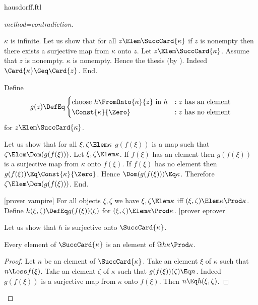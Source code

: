 \documentclass{stex}
\begin{document}
\begin{smodule}{hausdorff.ftl}
\begin{forthel}
\begin{proof}[method=contradiction]
\begin{case}{$\kappa$ is infinite.}
      Let us show that for all $z \Elem \SuccCard{\kappa}$ if $z$ is nonempty then there exists a surjective map from $\kappa$ onto $z$.
        Let $z \Elem \SuccCard{\kappa}$.
        Assume that $z$ is nonempty.
        $\kappa$ is nonempty.
        Hence the thesis (by ).
        Indeed $\Card{\kappa} \Geq \Card{z}$.
      End.
  
      Define \[ g(z) \DefEq
        \begin{cases}
          \text{choose $h \FromOnto{\kappa}{z}$ in $h$}
          & : \text{$z$ has an element}
          \\
          \text{$\Const{\kappa}{\Zero}$}
          & : \text{$z$ has no element}
        \end{cases}
      \] for $z \Elem \SuccCard{\kappa}$.
  
      Let us show that for all $\xi, \zeta \Elem \kappa$ $g(f(\xi))$ is a map such that $\zeta \Elem\linebreak \Dom(g(f(\xi)))$.
        Let $\xi, \zeta \Elem \kappa$.
        If $f(\xi)$ has an element then $g(f(\xi))$ is a surjective map from $\kappa$ onto $f(\xi)$.
        If $f(\xi)$ has no element then $g(f(\xi)) \Eq\linebreak \Const{\kappa}{\Zero}$.
        Hence $\Dom(g(f(\xi))) \Eq \kappa$.
        Therefore $\zeta \Elem \Dom(g(f(\xi)))$.
      End.
  
      [prover vampire]
      For all objects $\xi, \zeta$ we have $\xi, \zeta \Elem \kappa$ iff $(\xi, \zeta) \Elem \kappa \Prod \kappa$.
      Define $h(\xi,\zeta) \DefEq g(f(\xi))(\zeta)$ for $(\xi,\zeta) \Elem \kappa \Prod \kappa$.
      [prover eprover]

      Let us show that $h$ is surjective onto $\SuccCard{\kappa}$.
  
        Every element of $\SuccCard{\kappa}$ is an element of $\Im{h}{\kappa \Prod \kappa}$.
        \begin{proof}
          Let $n$ be an element of $\SuccCard{\kappa}$.
          Take an element $\xi$ of $\kappa$ such that $n \Less f(\xi)$.
          Take an element $\zeta$ of $\kappa$ such that $g(f(\xi))(\zeta) \Eq n$.
          Indeed $g(f(\xi))$ is a surjective map from $\kappa$ onto $f(\xi)$.
          Then $n \Eq h(\xi,\zeta)$.
        \end{proof}
  

\end{case}
\end{proof}
\end{forthel}
\end{smodule}
\end{document}
